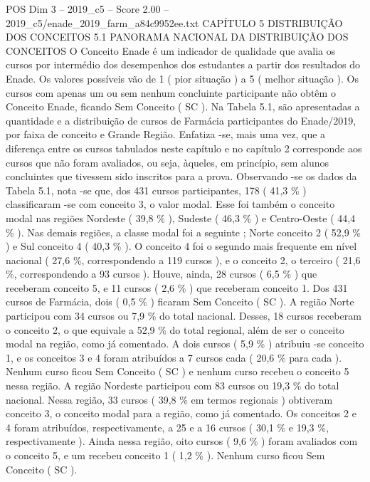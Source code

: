 \begin{textsample}{POS Dim 3 – 2019\_c5 – Score 2.00 – 2019\_c5/enade\_2019\_farm\_a84c9952ee.txt}  \label{ex:f3_pos_072}
CAPÍTULO 5 DISTRIBUIÇÃO DOS CONCEITOS 5.1 PANORAMA NACIONAL DA DISTRIBUIÇÃO DOS CONCEITOS O Conceito Enade é um indicador de qualidade que avalia os cursos por intermédio dos desempenhos dos estudantes a partir dos resultados do Enade.
Os valores possíveis vão de 1 ( pior situação ) a 5 ( melhor situação ).
Os cursos com apenas um ou sem nenhum concluinte participante não obtêm o Conceito Enade, ficando Sem Conceito ( SC ).
Na Tabela 5.1, são apresentadas a quantidade e a distribuição de cursos de Farmácia participantes do Enade/2019, por faixa de conceito e Grande Região.
Enfatiza -se, mais uma vez, que a diferença entre os cursos tabulados neste capítulo e no capítulo 2 corresponde aos cursos que não foram avaliados, ou seja, àqueles, em princípio, sem alunos concluintes que tivessem sido inscritos para a prova.
Observando -se os dados da Tabela 5.1, nota -se que, dos 431 cursos participantes, 178 ( 41,3 \% ) classificaram -se com conceito 3, o valor modal.
Esse foi também o conceito modal nas regiões Nordeste ( 39,8 \% ), Sudeste ( 46,3 \% ) e Centro-Oeste ( 44,4 \% ).
Nas demais regiões, a classe modal foi a seguinte ; Norte conceito 2 ( 52,9 \% ) e Sul conceito 4 ( 40,3 \% ).
O conceito 4 foi o segundo mais frequente em nível nacional ( 27,6 \%, correspondendo a 119 cursos ), e o conceito 2, o terceiro ( 21,6 \%, correspondendo a 93 cursos ).
Houve, ainda, 28 cursos ( 6,5 \% ) que receberam conceito 5, e 11 cursos ( 2,6 \% ) que receberam conceito 1.
Dos 431 cursos de Farmácia, dois ( 0,5 \% ) ficaram Sem Conceito ( SC ).
A região Norte participou com 34 cursos ou 7,9 \% do total nacional.
Desses, 18 cursos receberam o conceito 2, o que equivale a 52,9 \% do total regional, além de ser o conceito modal na região, como já comentado.
A dois cursos ( 5,9 \% ) atribuiu -se conceito 1, e os conceitos 3 e 4 foram atribuídos a 7 cursos cada ( 20,6 \% para cada ).
Nenhum curso ficou Sem Conceito ( SC ) e nenhum curso recebeu o conceito 5 nessa região.
A região Nordeste participou com 83 cursos ou 19,3 \% do total nacional.
Nessa região, 33 cursos ( 39,8 \% em termos regionais ) obtiveram conceito 3, o conceito modal para a região, como já comentado.
Os conceitos 2 e 4 foram atribuídos, respectivamente, a 25 e a 16 cursos ( 30,1 \% e 19,3 \%, respectivamente ).
Ainda nessa região, oito cursos ( 9,6 \% ) foram avaliados com o conceito 5, e um recebeu conceito 1 ( 1,2 \% ).
Nenhum curso ficou Sem Conceito ( SC ).

\end{textsample}
